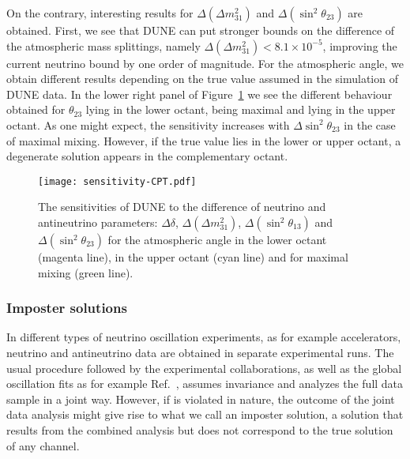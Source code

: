 On the contrary, interesting results for $\Delta(\Delta m_{31}^2)$ and $\Delta(\sin^2\theta_{23})$ are obtained. First, we see that  DUNE can put stronger bounds on the difference of the atmospheric mass splittings, namely $\Delta(\Delta m_{31}^2) < 8.1\times 10^{-5}$, improving the current neutrino bound by one order of magnitude. For the atmospheric angle, we obtain different results depending on the true value assumed in the simulation of DUNE data. In the lower right panel of Figure~\ref{fig:sensitivity-CPT} we see the different behaviour obtained for $\theta_{23}$ lying in the lower octant, being maximal and lying in the upper octant. As one might expect, the sensitivity increases with $\Delta\sin^2\theta_{23}$ in the case of maximal mixing. However, if the true value lies in the lower or upper octant, a degenerate solution appears in the complementary octant.
\begin{figure}[!htb]
 \centering
        \texttt{[image: sensitivity-CPT.pdf]}
        \caption[Sensitivities to the difference of neutrino and antineutrino parameters]{The sensitivities of DUNE to the difference of neutrino and antineutrino parameters: 
        $\Delta\delta$, $\Delta(\Delta m_{31}^2)$, $\Delta(\sin^2\theta_{13})$ and $\Delta(\sin^2\theta_{23})$  
        for the atmospheric angle in the lower octant (magenta line),  in the upper octant (cyan line) and for maximal mixing (green line).}
	\label{fig:sensitivity-CPT}
\end{figure}

\subsubsection{Imposter solutions}
\label{sec:impost}
In different types of neutrino oscillation experiments, as for example accelerators, neutrino and antineutrino data are obtained in separate experimental runs. The usual procedure followed by the experimental collaborations, as well as the global oscillation fits as for example Ref.~\cite{deSalas:2017kay}, assumes  invariance and analyzes the full data sample in a joint way. 
However, if  is violated in nature, the outcome of the joint data analysis might give rise to what we call an imposter solution, a solution that results from the combined analysis but does not correspond to the true solution of any channel. 

